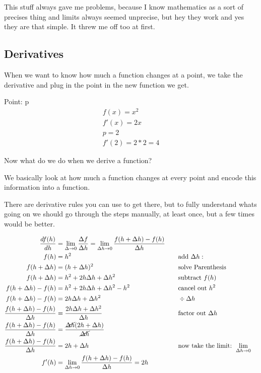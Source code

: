\documentclass{article}
\begin{document}
This stuff always gave me problems, because I know mathematics as a sort of precises thing
and limits always seemed unprecise, but hey they work and yes they are that simple. It threw
me off too at first.


\subsection{Derivatives}
When we want to know how much a function changes at a point, we take the derivative and
plug in the point in the new function we get.


Point: p
\begin{align}
f(x)=x^2
\\
f'(x)=2x
\\
p=2
\\
f'(2)=2*2=4
\end{align}

Now what do we do when we derive a function?

We basically look at how much a function changes at every point and encode this information
into a function.

There are derivative rules you can use to get there, but to fully understand
whats going on we should go through the steps manually, at least once,
but a few times would be better.

\begin{align*}
    \frac{df(h)}{dh} & = \lim_{\Delta \rightarrow 0} \frac{\Delta f}{\Delta h} = \lim_{\Delta h \rightarrow 0} \frac{f(h + \Delta h) - f(h)}{\Delta h}  
    \\
    f(h) &= h^2 & & \quad  \text{add } \Delta h:
    \\
    f(h + \Delta h) &= (h + \Delta h)^2 & & \quad \text{solve Parenthesis}
    \\
    f(h + \Delta h) &= h^2 + 2h\Delta h + \Delta h^2 & & \quad \text{subtract } f(h)
    \\
    f(h + \Delta h) - f(h) &= h^2 + 2h\Delta h + \Delta h^2 - h^2 & & \quad \text{cancel out } h^2
    \\
    f(h + \Delta h) - f(h) &= 2h\Delta h + \Delta h^2 & & \quad \div \Delta h
    \\
    \frac{f(h + \Delta h) - f(h)}{\Delta h} &= \frac{2h\Delta h + \Delta h^2}{\Delta h} & & \quad \text{factor out } \Delta h
    \\
    \frac{f(h + \Delta h) - f(h)}{\Delta h} &= \frac{\cancel{\Delta h}(2h + \Delta h)}{\cancel{\Delta h}} & & \quad
    \\
    \frac{f(h + \Delta h) - f(h)}{\Delta h} &= 2h + \Delta h & & \quad \text{now  take the limit: } \lim_{\Delta h \to 0}
    \\
    f'(h) &= \lim_{\Delta h \to 0} \frac{f(h + \Delta h) - f(h)}{\Delta h} = 2h & & \quad
\end{align*}
\end{document}
